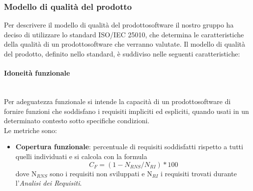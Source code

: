 \subsubsection{Modello di qualità del prodotto} 
Per descrivere il modello di qualità del prodotto\glosp software il nostro gruppo ha deciso di utilizzare lo standard ISO/IEC 25010, che determina le caratteristiche della qualità di un prodotto\glosp software che verranno valutate. Il modello di qualità del prodotto\glo, definito nello standard, è suddiviso nelle seguenti caratteristiche:
	\paragraph{Idoneità funzionale} \mbox{}\\
	Per adeguatezza funzionale si intende la capacità di un prodotto\glosp software di fornire funzioni che soddisfano i requisiti impliciti ed espliciti, quando usati in un determinato contesto sotto specifiche condizioni. \\
	Le metriche sono:
	\begin{itemize}
		\item \textbf{Copertura funzionale}: percentuale di requisiti soddisfatti rispetto a tutti quelli individuati e si calcola con la formula
		\[C_F=(1-N_{RNS}/N_{RI})*100\]
		dove N$_{RNS}$ sono i requisiti non sviluppati e N$_{RI}$ i requisiti trovati durante l'\textit{Analisi dei Requisiti}.
	\end{itemize}

